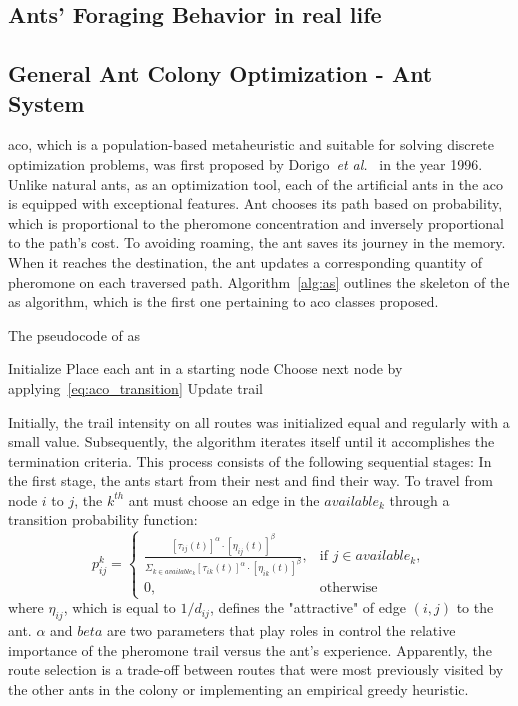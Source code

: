 \subsection{ Ants’ Foraging Behavior in real life}

\subsection{General Ant Colony Optimization - Ant System}
\acrfull{aco}, which is a population-based metaheuristic and suitable for solving discrete optimization problems, was first proposed by Dorigo~\textit{et al.}~\cite{dorigo1996ant} in the year 1996. Unlike natural ants, as an optimization tool, each of the artificial ants in the \gls{aco} is equipped with exceptional features. Ant chooses its path based on probability, which is proportional to the pheromone concentration and inversely proportional to the path's cost. To avoiding roaming, the ant saves its journey in the memory. When it reaches the destination, the ant updates a corresponding quantity of pheromone on each traversed path. Algorithm~\ref{alg:as} outlines the skeleton of the \gls{as} algorithm, which is the first one pertaining to \gls{aco} classes proposed.

\begin{algorithm}
	\caption{The pseudocode of \gls{as}}
	\label{alg:as}
	\Begin
	{	
		Initialize 
		{
			Place each ant in a starting node\;
			{
				{
					Choose next node by applying~\ref{eq:aco_transition} \;
					Update trail\;
				}
			}
		}
	}
\end{algorithm}

Initially, the trail intensity on all routes was initialized equal and regularly with a small value. Subsequently, the algorithm iterates itself until it accomplishes the termination criteria. This process consists of the following sequential stages: In the first stage, the ants start from their nest and find their way. To travel from node $i$ to $j$, the $k^{th}$ ant must choose an edge in the $available_k$ through a transition probability function:
\begin{equation}
\label{eq:aco_transition}
p^k_{ij} =
\begin{cases}
	\frac{[\tau_{ij}(t)]^{\alpha} \cdot [\eta_{ij}(t)]^{\beta}} {\Sigma_{k \in available_k} [\tau_{ik}(t)]^{\alpha}\cdot [\eta_{ik}(t)]^{\beta}}, & \text{if $j \in available_k$}, \\
	0, & \text{otherwise}
\end{cases}
\end{equation}
where $\eta_{ij}$, which is equal to $1/d_{ij}$, defines the "attractive" of edge $(i,j)$ to the ant. $\alpha$ and $beta$ are two parameters that play roles in control the relative importance of the pheromone trail versus the ant's experience. Apparently, the route selection is a trade-off between routes that were most previously visited by the other ants in the colony or implementing an empirical greedy heuristic. 

